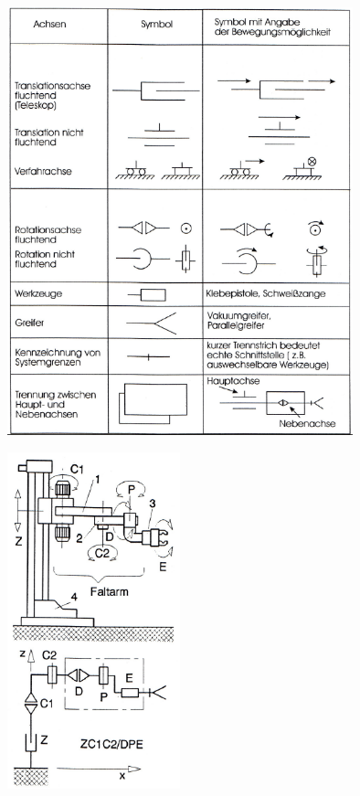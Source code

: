 \begin{minipage}{10cm}
	\includegraphics[width=10cm]{./bilder/symbole}
\end{minipage}
\begin{minipage}{8cm}
	\includegraphics[width=5cm]{./bilder/symbole-bsp}
\end{minipage}



